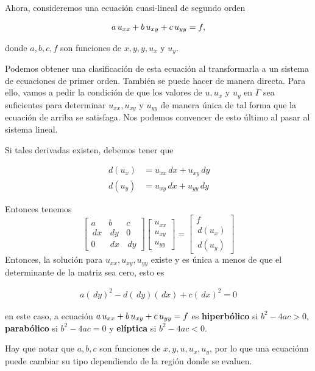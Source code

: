 Ahora, consideremos una ecuación cuasi-lineal de segundo orden

\begin{align*}
a \thinspace u_{xx} + b \thinspace u_{xy} + c \thinspace u_{yy} = f,
\end{align*}

donde $a,b,c,f$ son funciones de $x,y,y,u_x$ y $u_y$.

Podemos obtener una clasificación de esta ecuación al transformarla a un sistema de ecuaciones de primer orden. También se puede hacer de manera directa. Para ello, vamos a pedir la condición de que los valores de $u, u_x$ y $u_y$ en $\Gamma$ sea suficientes para determinar $u_{xx}, u_{xy}$ y $u_{yy}$ de manera única de tal forma que la ecuación de arriba se satisfaga. Nos podemos convencer de esto último al pasar al sistema lineal.

Si tales derivadas existen, debemos tener que

\begin{align*}
\,d(u_x) &= u_{xx} \,dx + u_{xy} \,dy \\
\,d(u_y) &= u_{xy} \,dx + u_{yy} \,dy
\end{align*}

Entonces tenemos
\[
\begin{bmatrix}
a	  &	  b	  &	c	\\
\,dx  &  \,dy  &	 0	\\
0	  &	\,dx	   & \,dy
\end{bmatrix}
\begin{bmatrix}
u_{xx}	\\	u_{xy}	\\	u_{yy}	
\end{bmatrix}
=
\begin{bmatrix}
f	\\	\,d(u_x)	\\	\,d(u_y)
\end{bmatrix}
\]
Entonces, la solución para $u_{xx}, u_{xy}, u_{yy}$ existe y es única a menos de que el determinante de la matriz sea cero, esto es

\begin{align*}
a (\,dy)^2 - d (\,dy)(\,dx) + c (\,dx)^2 = 0
\end{align*}

en este caso, a ecuación $a \thinspace u_{xx} + b \thinspace u_{xy} + c \thinspace u_{yy} = f$ es \textbf{hiperbólico} si $b^2 - 4ac > 0$, \textbf{parabólico} si $b^2 - 4ac = 0$ y \textbf{elíptica} si $b^2 - 4ac < 0$.

Hay que notar que $a, b, c$ son funciones de $x,y,u,u_x, u_y$, por lo que una ecuaciónn puede cambiar su tipo dependiendo de la región donde se evaluen.

